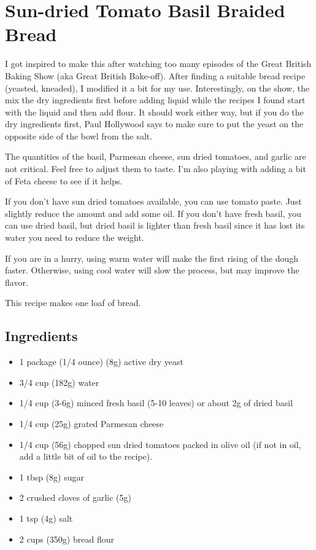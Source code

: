 \documentclass[10pt, openany]{book}
\begin{document}
\section{Sun-dried Tomato Basil Braided Bread}
\label{bread:SundriedTomatoBasil}
I got inspired to make this after watching too many episodes of the Great British Baking Show (aka Great British Bake-off).  After finding a suitable bread recipe (yeasted, kneaded), I modified it a bit for my use.  Interestingly, on the show, the mix the dry ingredients first before adding liquid while the recipes I found start with the liquid and then add flour.  It should work either way, but if you do the dry ingredients first, Paul Hollywood says to make sure to put the yeast on the opposite side of the bowl from the salt.

The quantities of the basil, Parmesan cheese, sun dried tomatoes, and garlic are not critical.  Feel free to adjust them to taste.  I'm also playing with adding a bit of Feta cheese to see if it helps.

If you don't have sun dried tomatoes available, you can use tomato paste.  Just slightly reduce the amount and add some oil.  If you don't have fresh basil, you can use dried basil, but dried basil is lighter than fresh basil since it has lost its water you need to reduce the weight.

If you are in a hurry, using warm water will make the first rising of the dough faster.  Otherwise, using cool water will slow the process, but may improve the flavor.

This recipe makes one loaf of bread.

\subsection{Ingredients}
\begin{itemize}
  \item 1 package (1/4 ounce) (8g) active dry yeast
  \item 3/4 cup (182g) water
  \item 1/4 cup (3-6g) minced fresh basil (5-10 leaves) or about 2g of dried basil
  \item 1/4 cup (25g) grated Parmesan cheese
  \item 1/4 cup (56g) chopped sun dried tomatoes packed in olive oil (if not in oil, add a little bit of oil to the recipe).
  \item 1 tbsp (8g) sugar
  \item 2 crushed cloves of garlic (5g)
  \item 1 tsp (4g) salt
  \item 2 cups (350g) bread flour
\end{itemize}
\end{document}
